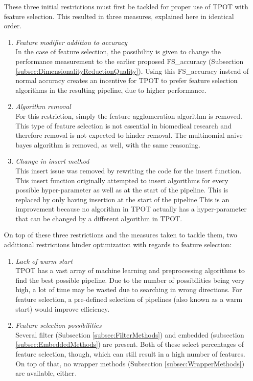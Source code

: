 	These three initial restrictions must first be tackled for proper use of TPOT with feature selection. This resulted in three measures, explained here in identical order.
	
	\begin{enumerate}
		\item \textit{Feature modifier addition to accuracy} \\
		In the case of feature selection, the possibility is given to change the performance measurement to the earlier proposed FS\_accuracy (Subsection \ref{subsec:DimensionalityReductionQuality}). Using this FS\_accuracy instead of normal accuracy creates an incentive for TPOT to prefer feature selection algorithms in the resulting pipeline, due to higher performance.
		\item \textit{Algorithm removal} \\
		For this restriction, simply the feature agglomeration algorithm is removed. This type of feature selection is not essential in biomedical research and therefore removal is not expected to hinder removal. The multinomial naive bayes algorithm is removed, as well, with the same reasoning.
		\item \textit{Change in insert method} \\
		This insert issue was removed by rewriting the code for the insert function. This insert function originally attempted to insert algorithms for every possible hyper-parameter as well as at the start of the pipeline. This is replaced by only having insertion at the start of the pipeline This is an improvement because no algorithm in TPOT actually has a hyper-parameter that can be changed by a different algorithm in TPOT.
	\end{enumerate}
	
	On top of these three restrictions and the measures taken to tackle them, two additional restrictions hinder optimization with regards to feature selection:
	
	\begin{enumerate}
				\item \textit{Lack of warm start} \\
		TPOT has a vast array of machine learning and preprocessing algorithms to find the best possible pipeline. Due to the number of possibilities being very high, a lot of time may be wasted due to searching in wrong directions. For feature selection, a pre-defined selection of pipelines (also known as a warm start) would improve efficiency.
		\item \textit{Feature selection possibilities} \\
		Several filter (Subsection \ref{subsec:FilterMethods}) and embedded (subsection \ref{subsec:EmbeddedMethods}) are present. Both of these select percentages of feature selection, though, which can still result in a high number of features. On top of that, no wrapper methods (Subsection \ref{subsec:WrapperMethods}) are available, either.
	\end{enumerate}
	
